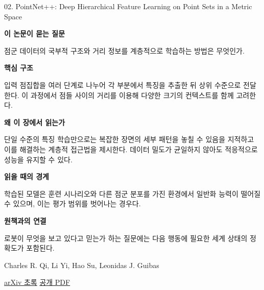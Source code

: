 \documentclass[11pt,openany]{book}
\begin{document}
\begin{termcard}{02. PointNet++: Deep Hierarchical Feature Learning on Point Sets in a Metric Space}

\par

\medskip

{\sffamily\bfseries\color{deepblue} 이 논문이 묻는 질문}\par

점군 데이터의 국부적 구조와 거리 정보를 계층적으로 학습하는 방법은 무엇인가.

\smallskip

{\sffamily\bfseries\color{deepblue} 핵심 구조}\par

입력 점집합을 여러 단계로 나누어 각 부분에서 특징을 추출한 뒤 상위 수준으로 전달한다. 이 과정에서 점들 사이의 거리를 이용해 다양한 크기의 컨텍스트를 함께 고려한다.

\smallskip

{\sffamily\bfseries\color{deepblue} 왜 이 장에서 읽는가}\par

단일 수준의 특징 학습만으로는 복잡한 장면의 세부 패턴을 놓칠 수 있음을 지적하고 이를 해결하는 계층적 접근법을 제시한다. 데이터 밀도가 균일하지 않아도 적응적으로 성능을 유지할 수 있다.

\smallskip

{\sffamily\bfseries\color{coral} 읽을 때의 경계}\par

학습된 모델은 훈련 시나리오와 다른 점군 분포를 가진 환경에서 일반화 능력이 떨어질 수 있으며, 이는 평가 범위를 벗어나는 경우다.

\smallskip

{\sffamily\bfseries\color{teal} 원책과의 연결}\par

로봇이 무엇을 보고 있다고 믿는가 하는 질문에는 다음 행동에 필요한 세계 상태의 정확도가 포함된다.

\medskip

{\footnotesize\color{muted} Charles R. Qi, Li Yi, Hao Su, Leonidas J. Guibas\par

\href{https://arxiv.org/abs/1706.02413}{arXiv 초록} \quad \href{https://arxiv.org/pdf/1706.02413}{공개 PDF}\par}

\end{termcard}
\end{document}
